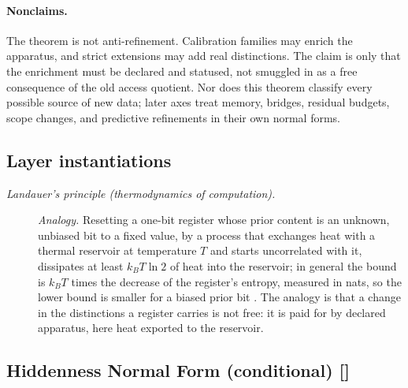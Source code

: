 \paragraph{Nonclaims.} The theorem is not anti-refinement.  Calibration families may enrich
the apparatus, and strict extensions may add real distinctions.  The
claim is only that the enrichment must be declared and statused, not
smuggled in as a free consequence of the old access quotient.  Nor
does this theorem classify every possible source of new data; later
axes treat memory, bridges, residual budgets, scope changes, and
predictive refinements in their own normal forms.

\subsection*{Layer instantiations}\label{layer-inst:F12}

\begingroup\small
\begin{description}
\item[\emph{Landauer's principle (thermodynamics of computation).}] \textit{Analogy.}
Resetting a one-bit register whose prior content is an unknown,
unbiased bit to a fixed value, by a process that exchanges heat with a
thermal reservoir at temperature \(T\) and starts uncorrelated with it,
dissipates at least \(k_B T\ln 2\) of heat into the reservoir; in
general the bound is \(k_BT\) times the decrease of the register's
entropy, measured in nats, so the lower bound is smaller for a biased prior bit
\citep{Landauer1961IrreversibilityHeatGeneration,ReebWolf2014ImprovedLandauer}.
The analogy is that a change in the distinctions a register carries is
not free: it is paid for by declared apparatus, here heat exported to
the reservoir.

\end{description}
\endgroup



\subsection{Hiddenness Normal Form (conditional) [\texorpdfstring{}{F13a}]}\label{sec:access:hiddenness}

